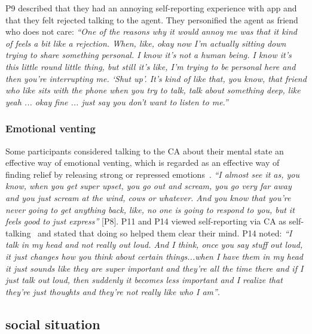             P9 described that they had an annoying self-reporting experience with \acl{app} and that they felt rejected talking to the agent. They personified the agent as friend who does not care:
                \textit{``One of the reasons why it would annoy me was that it kind of feels a bit like a rejection. When, like, okay now I'm actually sitting down trying to share something personal. I know it's not a human being. I know it's this little round little thing, but still it's like, I'm trying to be personal here and then you're interrupting me. `Shut up'. It's kind of like that, you know, that friend who like sits with the phone when you try to talk, talk about something deep, like yeah ... okay fine ... just say you don't want to listen to me.''}
       
        
        \subsubsection{Emotional venting}
            Some participants considered talking to the \ac{CA} about their mental state an effective way of emotional venting, which is regarded as an effective way of finding relief by releasing strong or repressed emotions~\cite{bennett1991irrationality, tonnaer2020explosive, leslie2008boxing}.
                \textit{``I almost see it as, you know, when you get super upset, you go out and scream, you go very far away and you just scream at the wind, cows or whatever. And you know that you're never going to get anything back, like, no one is going to respond to you, but it feels good to just express'' } [P8].
            P11 and P14 viewed self-reporting via \ac{CA} as self-talking~\cite{callicott2003effects,kendall1991guiding,treadwell1996self} and stated that doing so helped them clear their mind. P14 noted:
                \textit{``I talk in my head and not really out loud. And I think, once you say stuff out loud, it just changes how you think about certain things...when I have them in my head it just sounds like they are super important and they're all the time there and if I just talk out loud, then suddenly it becomes less important and I realize that they're just thoughts and they're not really like who I am''}.
        
        
        
        
        
        
        
    
    \subsection{social situation}
        
